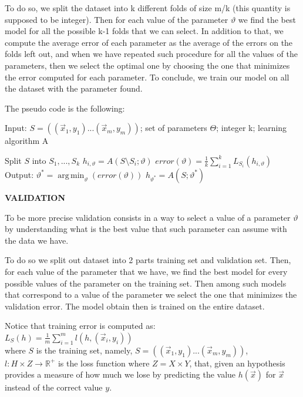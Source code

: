 \documentclass[a4paper,11pt,oneside]{book}
\DeclareMathOperator*{\argmin}{arg\,min}
\begin{document}
\begin{enumerate}
\begin{solution}
    To do so, we split the dataset into k different folds of size m/k (this quantity is supposed to be integer). Then for each value of the parameter $\vartheta$ we find the best model for all the possible k-1 folds that we can select. In addition to that, we compute the average error of each parameter as the average of the errors on the folds left out, and when we have repeated such procedure for all the values of the parameters, then we select the optimal one by choosing the one that minimizes the error computed for each parameter. To conclude, we train our model on all the dataset with the parameter found.
    
    The pseudo code is the following:
    
    Input: $S = ((\vec{x}_1, y_1) ... (\vec{x}_m, y_m))$; set of parameters $\Theta$; integer k; learning algorithm A
    
    \begin{algorithmic}[1]
    \State Split $S$ into $S_1, ..., S_k$
    \ForAll{$\vartheta \in \Theta$}
           \State $h_{i,\vartheta} = A(S\setminus S_i; \vartheta)$
           \State $error(\vartheta) = \frac{1}{k}\sum_{i=1}^k L_{S_i}(h_{i,\vartheta})$
       \EndFor
    \EndFor
    \State Output: $\vartheta^* = \argmin_\vartheta(error(\vartheta))$
    \State \hspace{35pt} $h_{\vartheta^*} = A(S; \vartheta^*)$
    \end{algorithmic}
    
    \textbf{VALIDATION}
    
    To be more precise validation consists in a way to select a value of a parameter $\vartheta$ by understanding what is the best value that such parameter can assume with the data we have.
    
    To do so we split out dataset into 2 parts training set and validation set. Then, for each value of the parameter that we have, we find the best model for every possible values of the parameter on the training set. Then among such models that correspond to a value of the parameter we select the one that minimizes the validation error. The model obtain then is trained on the entire dataset.
    
    Notice that training error is computed as: \\ $L_S(h) = \frac{1}{m}\sum_{i=1}^m l(h, (\vec{x}_i,y_i))$  \\ where $S$ is the training set, namely, $S = ((\vec{x}_1, y_1) ... (\vec{x}_m, y_m))$, $l: H \times Z \to \mathbb{R}^+$ is the loss function where $Z = X \times Y$, that, given an hypothesis provides a measure of how much we lose by predicting the value $h(\vec{x})$ for $\vec{x}$ instead of the correct value $y$.
    

\end{solution}
\end{enumerate}
\end{document}
